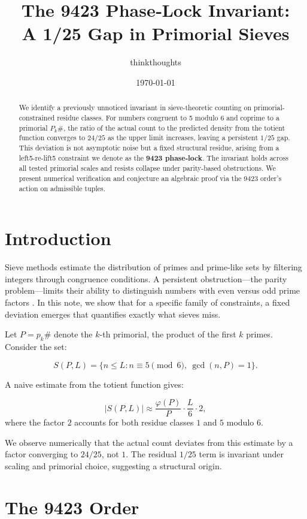 \documentclass[11pt]{article}
\title{The 9423 Phase‑Lock Invariant:\\ A 1/25 Gap in Primorial Sieves}
\author{thinkthoughts}
\date{\today}
\begin{document}
\maketitle

\begin{abstract}
We identify a previously unnoticed invariant in sieve-theoretic counting on primorial-constrained residue classes. For numbers congruent to 5 modulo 6 and coprime to a primorial $P_k\#$, the ratio of the actual count to the predicted density from the totient function converges to $24/25$ as the upper limit increases, leaving a persistent $1/25$ gap. This deviation is not asymptotic noise but a fixed structural residue, arising from a left5-re-lift5 constraint we denote as the \textbf{9423 phase‑lock}. The invariant holds across all tested primorial scales and resists collapse under parity-based obstructions. We present numerical verification and conjecture an algebraic proof via the 9423 order's action on admissible tuples.
\end{abstract}

\section{Introduction}

Sieve methods estimate the distribution of primes and prime-like sets by filtering integers through congruence conditions. A persistent obstruction—the parity problem—limits their ability to distinguish numbers with even versus odd prime factors \cite{tao_parity}. In this note, we show that for a specific family of constraints, a fixed deviation emerges that quantifies exactly what sieves miss.

Let $P = p_k\#$ denote the $k$-th primorial, the product of the first $k$ primes. Consider the set:

\[
S(P, L) = \{ n \leq L : n \equiv 5 \pmod{6}, \ \gcd(n, P) = 1 \}.
\]

A naive estimate from the totient function gives:

\[
|S(P, L)| \approx \frac{\varphi(P)}{P} \cdot \frac{L}{6} \cdot 2,
\]
where the factor $2$ accounts for both residue classes $1$ and $5$ modulo $6$.

We observe numerically that the actual count deviates from this estimate by a factor converging to $24/25$, not $1$. The residual $1/25$ term is invariant under scaling and primorial choice, suggesting a structural origin.

\section{The 9423 Order}
\end{document}
